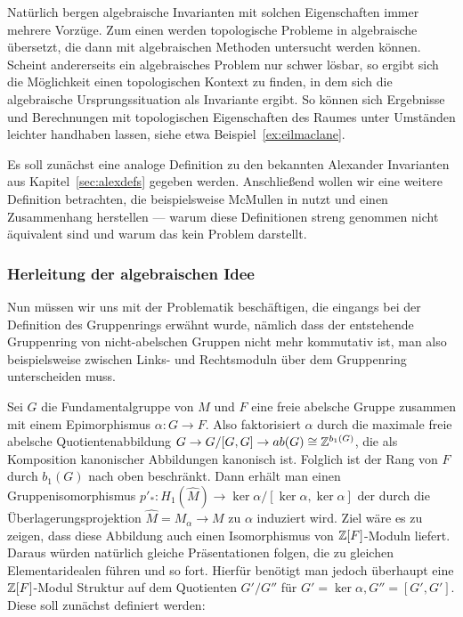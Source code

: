 Natürlich bergen algebraische Invarianten mit solchen Eigenschaften immer mehrere Vorzüge. Zum einen werden topologische Probleme in algebraische übersetzt, die dann mit algebraischen Methoden untersucht werden können. Scheint andererseits ein algebraisches Problem nur schwer lösbar, so ergibt sich die Möglichkeit einen topologischen Kontext zu finden, in dem sich die algebraische Ursprungssituation als Invariante ergibt. So können sich Ergebnisse und Berechnungen mit topologischen Eigenschaften des Raumes unter Umständen leichter handhaben lassen, siehe etwa Beispiel~\ref{ex:eilmaclane}.

Es soll zunächst eine analoge Definition zu den bekannten Alexander Invarianten aus Kapitel~\ref{sec:alexdefs} gegeben werden. Anschließend wollen wir eine weitere Definition betrachten, die beispielsweise McMullen in \cite{MCMULLEN.2002} nutzt und einen Zusammenhang herstellen --- warum diese Definitionen streng genommen nicht äquivalent sind und warum das kein Problem darstellt.

\subsubsection*{Herleitung der algebraischen Idee}
    
Nun müssen wir uns mit der Problematik beschäftigen, die eingangs bei der Definition des Gruppenrings erwähnt wurde, nämlich dass der entstehende Gruppenring von nicht-abelschen Gruppen nicht mehr kommutativ ist, man also beispielsweise zwischen Links- und Rechtsmoduln über dem Gruppenring unterscheiden muss.

Sei $G$ die Fundamentalgruppe von $M$ und $F$ eine freie abelsche Gruppe zusammen mit einem Epimorphismus $\alpha:G \to F$. Also faktorisiert $\alpha$ durch die maximale freie abelsche Quotientenabbildung $G \to G/[G,G] \to ab(G) \cong \mathbb{Z}^{b_1(G)}$, die als Komposition kanonischer Abbildungen kanonisch ist. Folglich ist der Rang von $F$ durch $b_1(G)$ nach oben beschränkt. Dann erhält man einen Gruppenisomorphismus $p'_*: H_1(\hat M) \to \ker\alpha/[\ker\alpha,\ker\alpha]$ der durch die Überlagerungsprojektion $\hat M = M_\alpha \to M$ zu $\alpha$ induziert wird. Ziel wäre es zu zeigen, dass diese Abbildung auch einen Isomorphismus von $\mathbb{Z}[F]$-Moduln liefert. Daraus würden natürlich gleiche Präsentationen folgen, die zu gleichen Elementaridealen führen und so fort. Hierfür benötigt man jedoch überhaupt eine $\mathbb{Z}[F]$-Modul Struktur auf dem Quotienten $G'/G''$ für $G'=\ker\alpha, G''=[G',G']$. Diese soll zunächst definiert werden:

